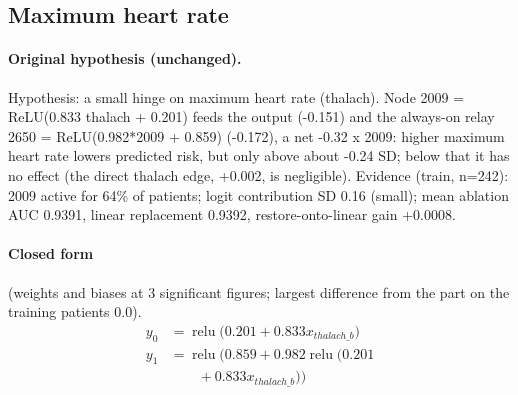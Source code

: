 \documentclass[a4paper,10pt]{article}
\newif\ifreviewmarks
\newcommand{\reviewrule}{\noindent{\color{BrickRed}\rule{\linewidth}{0.8pt}}}
\newenvironment{drafted}[1][]{%
  \ifreviewmarks\par\addvspace{\medskipamount}\reviewrule\par\nopagebreak
  \noindent{\color{BrickRed}\sffamily\footnotesize\textbf{Thesis Draft}\quad #1\hfill review}\par\nopagebreak\smallskip\fi}{%
  \ifreviewmarks\par\smallskip\noindent{\color{BrickRed}\sffamily\footnotesize end of thesis draft}\par\nopagebreak\reviewrule\par\medskip\fi}
\begin{document}
\begin{drafted}[plain-language layer: heart-s1-c1]
\subsection{Maximum heart rate}\label{tech:ann32}
\paragraph{Original hypothesis (unchanged).} Hypothesis: a small hinge on maximum heart rate (thalach). Node 2009 = ReLU(0.833 thalach + 0.201) feeds the output (-0.151) and the always-on relay 2650 = ReLU(0.982*2009 + 0.859) (-0.172), a net -0.32 x 2009: higher maximum heart rate lowers predicted risk, but only above about -0.24 SD; below that it has no effect (the direct thalach edge, +0.002, is negligible). Evidence (train, n=242): 2009 active for 64\% of patients; logit contribution SD 0.16 (small); mean ablation AUC 0.9391, linear replacement 0.9392, restore-onto-linear gain +0.0008.
\paragraph{Closed form} {\footnotesize(weights and biases at 3 significant figures; largest difference from the part on the training patients 0.0).}
{\small\begingroup\allowdisplaybreaks
\begin{align*}
y_{0} &= \operatorname{relu}\bigl(0.201 + 0.833 x_{thalach\_b}\bigr) \\
y_{1} &= \operatorname{relu}\bigl(0.859 + 0.982 \operatorname{relu}\bigl(0.201 \\
&\qquad + 0.833 x_{thalach\_b}\bigr)\bigr)
\end{align*}\endgroup}


\end{drafted}
\end{document}
